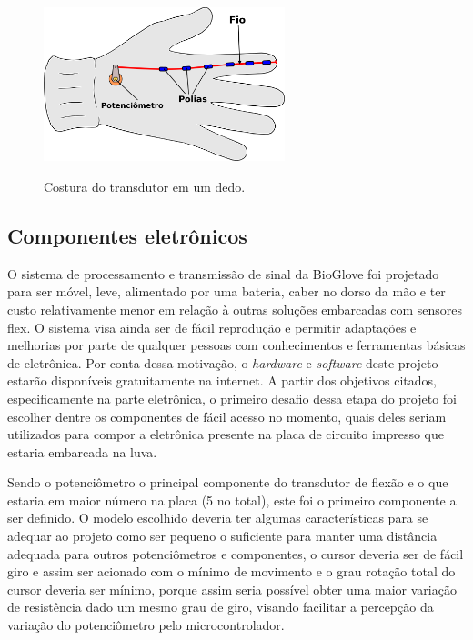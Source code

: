\documentclass[
	12pt,				%
	openright,			%
	oneside,			%
	a4paper,			%
	english,			%
	brazil				%
	]{abntex2}
\begin{document}
		\begin{figure}[h!]
			\centering
			\caption{Costura do transdutor em um dedo.}
  		\includegraphics[width=7cm]{./figures/glove-wire-pot1.png}
  		\label{Fig:glove-wire-pot1}
		\end{figure}

			
			\subsection{Componentes eletrônicos}	

			O sistema de processamento e transmissão de sinal da BioGlove foi projetado para ser móvel, leve, alimentado por uma bateria, caber no dorso da mão e ter custo relativamente menor em relação à outras soluções embarcadas com sensores flex. O sistema visa ainda ser de fácil reprodução e permitir adaptações e melhorias por parte de qualquer pessoas com conhecimentos e ferramentas básicas de eletrônica. Por conta dessa motivação, o \textit{hardware} e \textit{software} deste projeto estarão disponíveis gratuitamente na internet. A partir dos objetivos citados, especificamente na parte eletrônica, o primeiro desafio dessa etapa do projeto foi escolher dentre os componentes de fácil acesso no momento, quais deles seriam utilizados para compor a eletrônica presente na placa de circuito impresso que estaria embarcada na luva.
			
			Sendo o potenciômetro o principal componente do transdutor de flexão e o que estaria em maior número na placa (5 no total), este foi o primeiro componente a ser definido. O modelo escolhido deveria ter algumas características para se adequar ao projeto como ser pequeno o suficiente para manter uma distância adequada para outros potenciômetros e componentes, o cursor deveria ser de fácil giro e assim ser acionado com o mínimo de movimento e o grau rotação total do cursor deveria ser mínimo, porque assim seria possível obter uma maior variação de resistência dado um mesmo grau de giro, visando facilitar a percepção da variação do potenciômetro pelo microcontrolador. 
			
\end{document}
